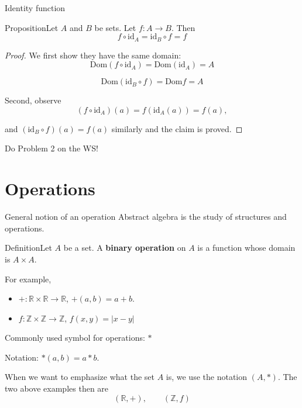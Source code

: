 \documentclass{beamer}
\def\bl[#1]#2{\begin{block}{#1}#2\end{block}}
\def\itemb{\begin{itemize}}
\def\iteme{\end{itemize}}
\begin{document}
\begin{frame}{Identity function}
\bl[Proposition]{Let $A$ and $B$ be sets. Let $f:A\to B$. Then\vspace{-0.2cm}
\[
f\circ\textrm{id}_A=\textrm{id}_B\circ f=f
\]}
\begin{proof}
We first show they have the same domain: \vspace{-0.2cm}
\[
\textrm{Dom}(f\circ\textrm{id}_A)=\textrm{Dom}(\textrm{id}_A)=A
\]\vspace{-1.2cm}


\[
\textrm{Dom}(\textrm{id}_B\circ f)=\textrm{Dom}f=A
\]\vspace{-0.6cm}

Second, observe\vspace{-0.2cm}
\[
(f\circ\textrm{id}_A)(a)=f(\textrm{id}_A(a))=f(a),
\]\vspace{-0.6cm}

and $(\textrm{id}_B\circ f)(a)=f(a)$ similarly and the claim is proved.
\end{proof}

\begin{center}{Do Problem 2 on the WS!}\end{center}
\end{frame}

\section{Operations}

\begin{frame}{General notion of an operation}
Abstract algebra is the study of structures and operations.
\bl[Definition]{Let $A$ be a set. A \textbf{binary operation} on $A$ is a function whose domain is $A\times A$.}
For example,
\itemb
\item $+:\mathbb{R}\times\mathbb{R}\to\mathbb{R}$, $+(a,b)=a+b$.
\item $f:\mathbb{Z}\times\mathbb{Z}\to\mathbb{Z}$, $f(x,y)=|x-y|$
\iteme
Commonly used symbol for operations: $*$

Notation: $*(a,b)=a*b$.\vspace{0.5cm}

When we want to emphasize what the set $A$ is, we use the notation $(A,*)$. The two above examples then are
\[
(\mathbb{R},+),\qquad (\mathbb{Z},f)
\]
\end{frame}
\end{document}
